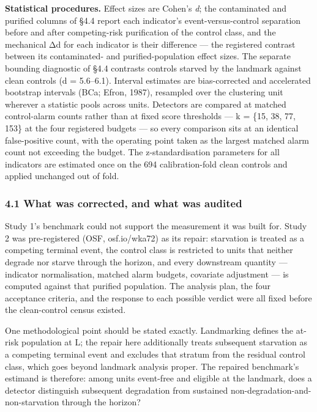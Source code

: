 \documentclass[
  11pt,
]{article}
\begin{document}
\textbf{Statistical procedures.} Effect sizes are Cohen's \emph{d}; the
contaminated and purified columns of §4.4 report each indicator's
event-versus-control separation before and after competing-risk
purification of the control class, and the mechanical Δd for each
indicator is their difference --- the registered contrast between its
contaminated- and purified-population effect sizes. The separate
bounding diagnostic of §4.4 contrasts controls starved by the landmark
against clean controls (\textbar d\textbar{} = 5.6--6.1). Interval
estimates are bias-corrected and accelerated bootstrap intervals (BCa;
Efron, 1987), resampled over the clustering unit wherever a statistic
pools across units. Detectors are compared at matched control-alarm
counts rather than at fixed score thresholds --- k = \{15, 38, 77, 153\}
at the four registered budgets --- so every comparison sits at an
identical false-positive count, with the operating point taken as the
largest matched alarm count not exceeding the budget. The
z-standardisation parameters for all indicators are estimated once on
the 694 calibration-fold clean controls and applied unchanged out of
fold.

\subsubsection{4.1 What was corrected, and what was
audited}\label{what-was-corrected-and-what-was-audited}

Study 1's benchmark could not support the measurement it was built for.
Study 2 was pre-registered (OSF, osf.io/wka72) as its repair: starvation
is treated as a competing terminal event, the control class is
restricted to units that neither degrade nor starve through the horizon,
and every downstream quantity --- indicator normalisation, matched alarm
budgets, covariate adjustment --- is computed against that purified
population. The analysis plan, the four acceptance criteria, and the
response to each possible verdict were all fixed before the
clean-control census existed.

One methodological point should be stated exactly. Landmarking defines
the at-risk population at L; the repair here additionally treats
subsequent starvation as a competing terminal event and excludes that
stratum from the residual control class, which goes beyond landmark
analysis proper. The repaired benchmark's estimand is therefore: among
units event-free and eligible at the landmark, does a detector
distinguish subsequent degradation from sustained
non-degradation-and-non-starvation through the horizon?
\end{document}
